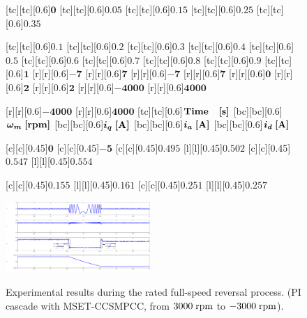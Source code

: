\documentclass[a4paper, 8pt, twocolumn]{IEEEtran}
\begin{document}
\begin{figure}[htbp]
\def\size{0.6}
\def\sizetwo{0.45}
\centering
{}[tc][tc][\size]{$\bm{0}$}
[tc][tc][\size]{$\bm{0.05}$}
[tc][tc][\size]{$\bm{0.15}$}
[tc][tc][\size]{$\bm{0.25}$}
[tc][tc][\size]{$\bm{0.35}$}

[tc][tc][\size]{$\bm{0.1}$}
[tc][tc][\size]{$\bm{0.2}$}
[tc][tc][\size]{$\bm{0.3}$}
[tc][tc][\size]{$\bm{0.4}$}
[tc][tc][\size]{$\bm{0.5}$}
[tc][tc][\size]{$\bm{0.6}$}
[tc][tc][\size]{$\bm{0.7}$}
[tc][tc][\size]{$\bm{0.8}$}
[tc][tc][\size]{$\bm{0.9}$}
[tc][tc][\size]{$\bm{1}$}
[r][r][\size]{$\bm{-7}$}
[r][r][\size]{$\bm{7}$}
[r][r][\size]{$\bm{-7}$}
[r][r][\size]{$\bm{7}$}
[r][r][\size]{$\bm{0}$}
[r][r][\size]{$\bm{2}$}
[r][r][\size]{$\bm{2}$}
[r][r][\size]{$\bm{-4000}$}
[r][r][\size]{$\bm{4000}$}

[r][r][\size]{$\bm{-4000}$}
[r][r][\size]{$\bm{4000}$}
[tc][tc][\size]{$\rm \textbf{Time  \; [s]}$}
[bc][bc][\size]{$\bm{\omega_m}  \; \rm \textbf{[rpm]}$}
[bc][bc][\size]{$\bm{i_q}  \; \rm \textbf {[A]}$}
[bc][bc][\size]{$\bm{i_a}  \; \rm \textbf {[A]}$}
[bc][bc][\size]{$\bm{i_d}  \; \rm \textbf {[A]}$}

[c][c][\sizetwo]{$\bm{0}$}
[c][c][\sizetwo]{$\bm{-5}$}
[c][c][\sizetwo]{$\bm{0.495}$}
[l][l][\sizetwo]{$\bm{0.502}$}
[c][c][\sizetwo]{$\bm{0.547}$}
[l][l][\sizetwo]{$\bm{0.554}$}

[c][c][\sizetwo]{$\bm{0.155}$}
[l][l][\sizetwo]{$\bm{0.161}$}
[c][c][\sizetwo]{$\bm{0.251}$}
[l][l][\sizetwo]{$\bm{0.257}$}

\includegraphics[width=0.49\textwidth]{./figures/et_reverse.eps}\\
\caption{Experimental results during the rated full-speed reversal process. (PI cascade with MSET-CCSMPCC, from $\rm 3000 \; rpm$ to $\rm -3000 \; rpm$).}
\label{et_reverse}
\end{figure}
\end{document}
